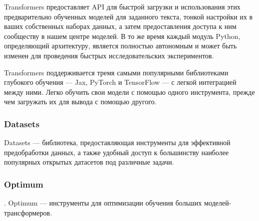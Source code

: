 Transformers предоставляет API для быстрой загрузки и использования этих предварительно обученных моделей для заданного текста, тонкой настройки их в ваших собственных наборах данных, а затем предоставления доступа к ним сообществу в нашем центре моделей. В то же время каждый модуль Python, определяющий архитектуру, является полностью автономным и может быть изменен для проведения быстрых исследовательских экспериментов.

Transformers поддерживается тремя самыми популярными библиотеками глубокого обучения — Jax, PyTorch и TensorFlow --- с легкой интеграцией между ними. Легко обучить свои модели с помощью одного инструмента, прежде чем загружать их для вывода с помощью другого.

\subsubsection{Datasets} Datasets --- библиотека, предоставляющая инструменты для эффективной предобработки данных, а также удобный доступ к большинству наиболее популярных открытых датасетов под различные задачи.

\subsubsection{Optimum}. Optimum --- инструменты для оптимизации обучения больших моделей-трансформеров.